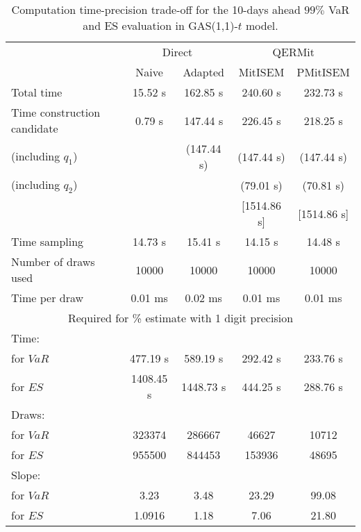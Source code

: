 { \renewcommand{\arraystretch}{1.3} 
\begin{table}[h] 
\centering 
\caption{Computation time-precision trade-off for the 10-days ahead  $99\%$ VaR and ES evaluation in GAS(1,1)-$t$ model.} 
\label{tab:time_precision_t_gas} 
\begin{tabular}{lcccc}  
  & \multicolumn{2}{c}{Direct} & \multicolumn{2}{c}{QERMit}  \\ \cline{2-5} 
  & Naive & Adapted & MitISEM & PMitISEM  \\ \hline 
Total time & 15.52 s & 162.85 s & 240.60 s & 232.73 s \\ 
Time construction candidate & 0.79 s & 147.44 s & 226.45 s & 218.25 s \\ 
 (including $q_{1}$) &   &  (147.44 s) & (147.44 s) & (147.44 s) \\ 
 (including $q_{2}$) &   &  & (79.01 s) & (70.81 s) \\ 
[Initialisation for $q_{2}$]&   &   & [1514.86 s] & [1514.86 s] \\ 
Time sampling & 14.73 s & 15.41 s & 14.15 s & 14.48 s  \\  
Number of draws used & 10000 & 10000 & 10000 & 10000 \\ 
Time per draw & 0.01 ms & 0.02 ms & 0.01 ms & 0.01 ms \\ \hline 
\multicolumn{5}{c}{Required for \% estimate with 1 digit precision} \\ \hline 
Time: &  &  &   &  \\ 
\hspace{1cm} for $VaR$ & 477.19 s & 589.19 s & 292.42 s & 233.76 s \\ 
\hspace{1cm} for $ES$ & 1408.45 s & 1448.73 s & 444.25 s & 288.76 s \\ 
Draws: &  &  &   &  \\ 
\hspace{1cm} for $VaR$ & 323374 & 286667  &  46627  &  10712  \\ 
\hspace{1cm} for $ES$ & 955500 & 844453  & 153936   &  48695  \\ 
\hline 
Slope: &  &  &   &  \\ 
\hspace{1cm} for $VaR$ & 3.23 & 3.48  & 23.29  & 99.08  \\ 
\hspace{1cm} for $ES$ & 1.0916 & 1.18  & 7.06   & 21.80  \\  \hline 
\end{tabular} 
\end{table} 
} 
